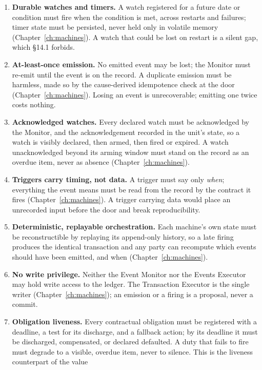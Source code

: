 \documentclass[11pt,a4paper]{article}
\begin{document}
\begin{enumerate}[label=\textbf{M\arabic*.}, ref=M\arabic*, leftmargin=*, itemsep=3pt]
\item \textbf{Durable watches and timers.} A watch registered for a future date or
  condition must fire when the condition is met, across restarts and failures; timer state
  must be persisted, never held only in volatile memory (Chapter~\ref{ch:machines}). A
  watch that could be lost on restart is a silent gap, which \S 14.1 forbids.
\item \textbf{At-least-once emission.} No emitted event may be lost; the Monitor must
  re-emit until the event is on the record. A duplicate emission must be harmless, made so
  by the cause-derived idempotence check at the door (Chapter~\ref{ch:machines}). Losing an
  event is unrecoverable; emitting one twice costs nothing.
\item \textbf{Acknowledged watches.} Every declared watch must be acknowledged by the
  Monitor, and the acknowledgement recorded in the unit's state, so a watch is visibly
  declared, then armed, then fired or expired. A watch unacknowledged beyond its arming
  window must stand on the record as an overdue item, never as absence
  (Chapter~\ref{ch:machines}).
\item \textbf{Triggers carry timing, not data.} A trigger must say only \emph{when};
  everything the event means must be read from the record by the contract it fires
  (Chapter~\ref{ch:machines}). A trigger carrying data would place an unrecorded input
  before the door and break reproducibility.
\item \textbf{Deterministic, replayable orchestration.} Each machine's own state must be
  reconstructible by replaying its append-only history, so a late firing produces the
  identical transaction and any party can recompute which events should have been emitted,
  and when (Chapter~\ref{ch:machines}).
\item \textbf{No write privilege.} Neither the Event Monitor nor the Events Executor may
  hold write access to the ledger. The Transaction Executor is the single writer
  (Chapter~\ref{ch:machines}); an emission or a firing is a proposal, never a commit.
\item \textbf{Obligation liveness.} Every contractual obligation must be registered with a
  deadline, a test for its discharge, and a fallback action; by its deadline it must be
  discharged, compensated, or declared defaulted. A duty that fails to fire must degrade to
  a visible, overdue item, never to silence. This is the liveness counterpart of the value

\end{enumerate}
\end{document}
